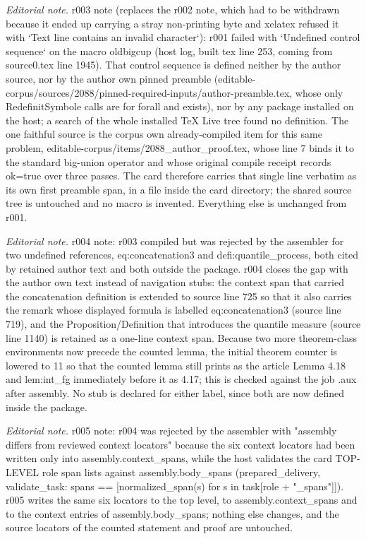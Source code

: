 \documentclass[10pt,a4paper]{article}
\theoremstyle{plain}
\theoremstyle{definition}
\begin{document}
\noindent\textit{Editorial note.} r003 note (replaces the r002 note, which had to be withdrawn because it ended up carrying a stray non-printing byte and xelatex refused it with `Text line contains an invalid character`): r001 failed with `Undefined control sequence` on the macro oldbigcup (host log, built tex line 253, coming from source0.tex line 1945). That control sequence is defined neither by the author source, nor by the author own pinned preamble (editable-corpus/sources/2088/pinned-required-inputs/author-preamble.tex, whose only RedefinitSymbole calls are for forall and exists), nor by any package installed on the host; a search of the whole installed TeX Live tree found no definition. The one faithful source is the corpus own already-compiled item for this same problem, editable-corpus/items/2088\_author\_proof.tex, whose line 7 binds it to the standard big-union operator and whose original compile receipt records ok=true over three passes. The card therefore carries that single line verbatim as its own first preamble span, in a file inside the card directory; the shared source tree is untouched and no macro is invented. Everything else is unchanged from r001.\par\medskip
\noindent\textit{Editorial note.} r004 note: r003 compiled but was rejected by the assembler for two undefined references, eq:concatenation3 and defi:quantile\_process, both cited by retained author text and both outside the package. r004 closes the gap with the author own text instead of navigation stubs: the context span that carried the concatenation definition is extended to source line 725 so that it also carries the remark whose displayed formula is labelled eq:concatenation3 (source line 719), and the Proposition/Definition that introduces the quantile measure (source line 1140) is retained as a one-line context span. Because two more theorem-class environments now precede the counted lemma, the initial theorem counter is lowered to 11 so that the counted lemma still prints as the article Lemma 4.18 and lem:int\_fg immediately before it as 4.17; this is checked against the job .aux after assembly. No stub is declared for either label, since both are now defined inside the package.\par\medskip
\noindent\textit{Editorial note.} r005 note: r004 was rejected by the assembler with "assembly differs from reviewed context locators" because the six context locators had been written only into assembly.context\_spans, while the host validates the card TOP-LEVEL role span lists against assembly.body\_spans (prepared\_delivery, validate\_task: spans == [normalized\_span(s) for s in task[role + "\_spans"]]). r005 writes the same six locators to the top level, to assembly.context\_spans and to the context entries of assembly.body\_spans; nothing else changes, and the source locators of the counted statement and proof are untouched.\par\medskip
\end{document}
